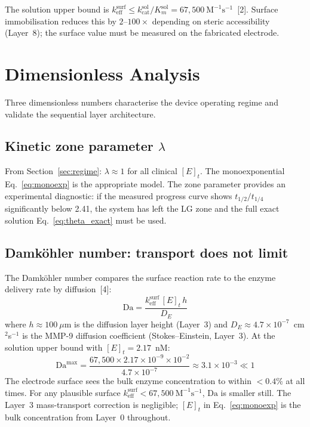 \documentclass[10pt,a4paper]{article}
\numberwithin{equation}{section}
\newcommand{\Mms}{\text{M}^{-1}\text{s}^{-1}}
\newcommand{\cit}[1]{[#1]}
\newcommand{\kcat}{k_{\text{cat}}}
\newcommand{\keff}{k_{\text{eff}}}
\newcommand{\Da}{\mathrm{Da}}
\begin{document}
The solution upper bound is $\keff^{\text{surf}} \leq \kcat^{\text{sol}}/K_m^{\text{sol}}
= 67{,}500\ \Mms$~\cit{2}. Surface immobilisation reduces this by $2$--$100\times$
depending on steric accessibility (Layer~8); the surface value must be measured on the
fabricated electrode.

\section{Dimensionless Analysis}
\label{sec:dimensionless}

Three dimensionless numbers characterise the device operating regime and validate the
sequential layer architecture.

\subsection{Kinetic zone parameter $\lambda$}

From Section~\ref{sec:regime}: $\lambda \approx 1$ for all clinical $[E]_t$.
The monoexponential Eq.~\eqref{eq:monoexp} is the appropriate model.
The zone parameter provides an experimental diagnostic: if the measured progress
curve shows $t_{1/2}/t_{1/4}$ significantly below 2.41, the system has left the LG
zone and the full exact solution Eq.~\eqref{eq:theta_exact} must be used.

\subsection{Damk\"{o}hler number: transport does not limit}

The Damk\"{o}hler number compares the surface reaction rate to the enzyme delivery
rate by diffusion~\cit{4}:
\begin{equation}
  \label{eq:Da}
  \Da = \frac{\keff^{\text{surf}}\,[E]_t\,h}{D_E}
\end{equation}
where $h \approx 100\ \mu$m is the diffusion layer height (Layer~3) and
$D_E \approx 4.7\times10^{-7}$~cm$^2$s$^{-1}$ is the MMP-9 diffusion coefficient
(Stokes--Einstein, Layer~3). At the solution upper bound with $[E]_t = 2.17$~nM:
\begin{equation}
  \label{eq:Da_eval}
  \Da^{\text{max}} = \frac{67{,}500 \times 2.17\times10^{-9} \times 10^{-2}}{4.7\times10^{-7}}
  \approx 3.1\times10^{-3} \ll 1
\end{equation}
The electrode surface sees the bulk enzyme concentration to within $<0.4\%$ at all times.
For any plausible surface $\keff^{\text{surf}} < 67{,}500\ \Mms$, $\Da$ is smaller still.
The Layer~3 mass-transport correction is negligible; $[E]_t$ in Eq.~\eqref{eq:monoexp}
is the bulk concentration from Layer~0 throughout.
\end{document}
